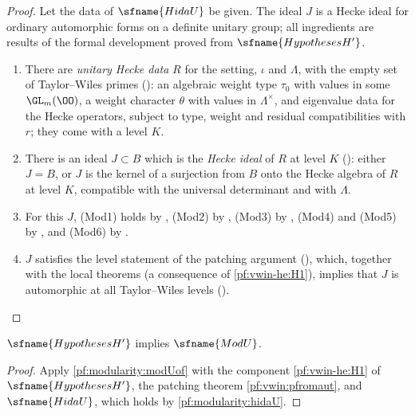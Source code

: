 \begin{proof}
Let the data of $\sfname{HidaU}$ be given. The ideal $J$ is a Hecke ideal for ordinary automorphic forms on a definite
unitary group; all ingredients are results of the formal development proved from $\sfname{HypothesesH'}$.
\begin{enumerate}[label=(\arabic*)]
\item There are \emph{unitary Hecke data} $R$ for the setting, $\iota$ and $\Lambda$, with the empty set of Taylor--Wiles
primes (): an algebraic weight type $\tau_0$ with values in some
$\GL_m(\OO)$, a weight character $\theta$ with values in $\Lambda^\times$, and eigenvalue data for the Hecke operators,
subject to type, weight and residual compatibilities with $r$; they come with a level $K$.
\item There is an ideal $J\subset B$ which is the \emph{Hecke ideal} of $R$ at level $K$
(): either $J=B$, or $J$ is the kernel of a surjection from $B$ onto the
Hecke algebra of $R$ at level $K$, compatible with the universal determinant and with $\Lambda$.
\item For this $J$, (Mod1) holds by , (Mod2) by
, (Mod3) by
, (Mod4) and (Mod5) by
, and (Mod6) by
.
\item $J$ satisfies the level statement of the patching argument
(), which, together with the local theorems (a consequence of
\ref{pf:vwin-he:H1}), implies that $J$ is automorphic at all Taylor--Wiles levels
().\qedhere
\end{enumerate}
\end{proof}

\begin{theorem}\label{pf:modularity:modU}
$\sfname{HypothesesH'}$ implies $\sfname{ModU}$.
\end{theorem}

\begin{proof}
Apply \cref{pf:modularity:modUof} with the component \ref{pf:vwin-he:H1} of $\sfname{HypothesesH'}$, the patching theorem
\cref{pf:vwin:pfromaut}, and $\sfname{HidaU}$, which holds by \cref{pf:modularity:hidaU}.
\end{proof}

